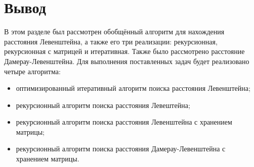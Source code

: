 \section{Вывод}
В этом разделе был рассмотрен обобщённый алгоритм для нахождения расстояния Левенштейна, а также его три реализации:
рекурсионная, рекурсионная с матрицей и итеративная. 
Также было рассмотрено расстояние Дамерау-Левенштейна.
Для выполнения поставленных задач будет реализовано четыре алгоритма:
\begin{itemize}
	\item оптимизированный итеративный алгоритм поиска расстояния Левенштейна;
	\item рекурсионный алгоритм поиска расстояния Левештейна;
	\item рекурсионный алгоритм поиска расстояния Левенштейна с хранением матрицы;
	\item рекурсионный алгоритм поиска расстояния Дамерау-Левенштейна с хранением матрицы.
\end{itemize}